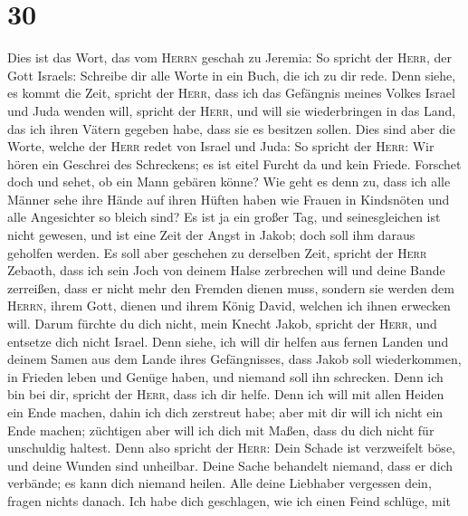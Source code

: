 \hypertarget{section-29}{%
\section{30}\label{section-29}}

 Dies ist das Wort, das vom \textsc{Herrn} geschah zu
Jeremia:  So spricht der \textsc{Herr}, der Gott Israels:
Schreibe dir alle Worte in ein Buch, die ich zu dir rede. 
Denn siehe, es kommt die Zeit, spricht der \textsc{Herr}, dass ich das
Gefängnis meines Volkes Israel und Juda wenden will, spricht der
\textsc{Herr}, und will sie wiederbringen in das Land, das ich ihren
Vätern gegeben habe, dass sie es besitzen sollen.  Dies
sind aber die Worte, welche der \textsc{Herr} redet von Israel und Juda:
 So spricht der \textsc{Herr}: Wir hören ein Geschrei des
Schreckens; es ist eitel Furcht da und kein Friede. 
Forschet doch und sehet, ob ein Mann gebären könne? Wie geht es denn zu,
dass ich alle Männer sehe ihre Hände auf ihren Hüften haben wie Frauen
in Kindsnöten und alle Angesichter so bleich sind?  Es ist
ja ein großer Tag, und seinesgleichen ist nicht gewesen, und ist eine
Zeit der Angst in Jakob; doch soll ihm daraus geholfen werden.
 Es soll aber geschehen zu derselben Zeit, spricht der
\textsc{Herr} Zebaoth, dass ich sein Joch von deinem Halse zerbrechen
will und deine Bande zerreißen, dass er nicht mehr den Fremden dienen
muss,  sondern sie werden dem \textsc{Herrn}, ihrem Gott,
dienen und ihrem König David, welchen ich ihnen erwecken will.
 Darum fürchte du dich nicht, mein Knecht Jakob, spricht
der \textsc{Herr}, und entsetze dich nicht Israel. Denn siehe, ich will
dir helfen aus fernen Landen und deinem Samen aus dem Lande ihres
Gefängnisses, dass Jakob soll wiederkommen, in Frieden leben und Genüge
haben, und niemand soll ihn schrecken.  Denn ich bin bei
dir, spricht der \textsc{Herr}, dass ich dir helfe. Denn ich will mit
allen Heiden ein Ende machen, dahin ich dich zerstreut habe; aber mit
dir will ich nicht ein Ende machen; züchtigen aber will ich dich mit
Maßen, dass du dich nicht für unschuldig haltest.  Denn
also spricht der \textsc{Herr}: Dein Schade ist verzweifelt böse, und
deine Wunden sind unheilbar.  Deine Sache behandelt
niemand, dass er dich verbände; es kann dich niemand heilen.
 Alle deine Liebhaber vergessen dein, fragen nichts
danach. Ich habe dich geschlagen, wie ich einen Feind schlüge, mit
